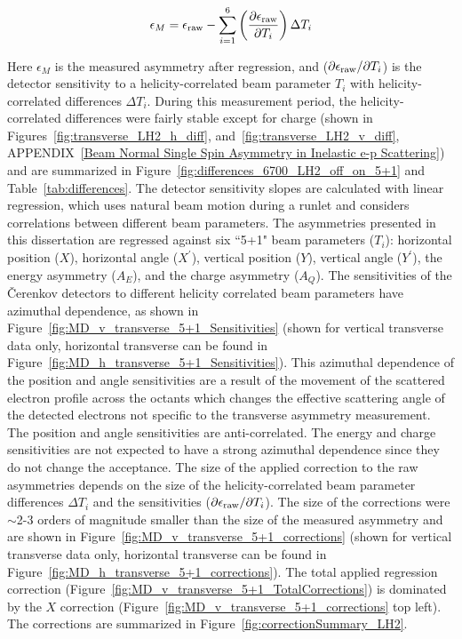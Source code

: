 \begin{equation} \label{equ:regression}
\epsilon_{M} = \epsilon_{\rm raw} - \sum^{6}_{i=1} \left(\frac{\partial \epsilon_{\rm raw} }{ \partial T_{i} }\right) \Delta T_{i}
\end{equation}

Here $\epsilon_{M}$ is the measured asymmetry after regression, and ($\partial \epsilon_{\rm raw}/\partial T_{i}$) is the detector sensitivity to a helicity-correlated beam parameter $T_{i}$ with helicity-correlated differences $\Delta T_{i}$. During this measurement period, the helicity-correlated differences were fairly stable except for charge (shown in Figures~\ref{fig:transverse_LH2_h_diff}, and~\ref{fig:transverse_LH2_v_diff}, APPENDIX~\ref{Beam Normal Single Spin Asymmetry in Inelastic e-p Scattering}) and are summarized in Figure~\ref{fig:differences_6700_LH2_off_on_5+1} and Table~\ref{tab:differences}. The detector sensitivity slopes are calculated with linear regression, which uses natural beam motion during a runlet and considers correlations between different beam parameters. The asymmetries presented in this dissertation are regressed against six ``5+1" beam parameters ($T_{i}$): horizontal position ($X$), horizontal angle ($X^{\prime}$), vertical position ($Y$), vertical angle ($Y^{\prime}$), the energy asymmetry ($A_{E}$), and the charge asymmetry ($A_{Q}$). The sensitivities of the \v{C}erenkov detectors to different helicity correlated beam parameters have azimuthal dependence, as shown in Figure~\ref{fig:MD_v_transverse_5+1_Sensitivities} (shown for vertical transverse data only, horizontal transverse can be found in Figure~\ref{fig:MD_h_transverse_5+1_Sensitivities}). This azimuthal dependence of the position and angle sensitivities are a result of the movement of the scattered electron profile across the octants which changes the effective scattering angle of the detected electrons not specific to the transverse asymmetry measurement. The position and angle sensitivities are anti-correlated. The energy and charge sensitivities are not expected to have a strong azimuthal dependence since they do not change the acceptance. The size of the applied correction to the raw asymmetries depends on the size of the helicity-correlated beam parameter differences $\Delta T_{i}$ and the sensitivities ($\partial \epsilon_{\rm raw}/\partial T_{i}$). The size of the corrections were $\sim$2-3 orders of magnitude smaller than the size of the measured asymmetry and are shown in Figure~\ref{fig:MD_v_transverse_5+1_corrections} (shown for vertical transverse data only, horizontal transverse can be found in Figure~\ref{fig:MD_h_transverse_5+1_corrections}). The total applied regression correction (Figure~\ref{fig:MD_v_transverse_5+1_TotalCorrections}) is dominated by the $X$ correction (Figure~\ref{fig:MD_v_transverse_5+1_corrections} top left). The corrections are summarized in Figure~\ref{fig:correctionSummary_LH2}.


